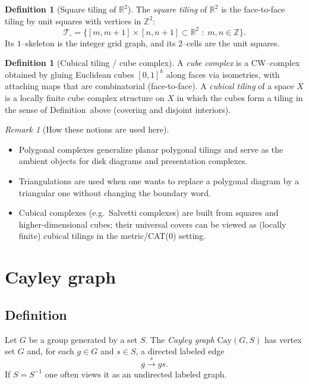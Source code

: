 \documentclass[11pt]{article}
\theoremstyle{definition}
\newtheorem{definition}[theorem]{Definition}
\theoremstyle{plain}
\theoremstyle{remark}
\newtheorem{remark}[theorem]{Remark}
\newcommand{\Cay}{\mathrm{Cay}}
\begin{document}
\begin{definition}[Square tiling of $\mathbb{R}^2$]
The \emph{square tiling} of $\mathbb{R}^2$ is the face-to-face tiling by unit squares with vertices in $\mathbb{Z}^2$:
\[
\mathcal{T}_{\square}=\bigl\{[m,m+1]\times[n,n+1]\subset\mathbb{R}^2 \;:\; m,n\in\mathbb{Z}\bigr\}.
\]
Its $1$--skeleton is the integer grid graph, and its $2$--cells are the unit squares.
\end{definition}

\begin{definition}[Cubical tiling / cube complex]
A \emph{cube complex} is a CW--complex obtained by gluing Euclidean cubes $[0,1]^k$ along faces via isometries,
with attaching maps that are combinatorial (face-to-face).
A \emph{cubical tiling} of a space $X$ is a locally finite cube complex structure on $X$ in which the cubes form a tiling
in the sense of Definition~above (covering and disjoint interiors).
\end{definition}

\begin{remark}[How these notions are used here]
\begin{itemize}
\item Polygonal complexes generalize planar polygonal tilings and serve as the ambient objects for disk diagrams
and presentation complexes.
\item Triangulations are used when one wants to replace a polygonal diagram by a triangular one without changing
the boundary word.
\item Cubical complexes (e.g.\ Salvetti complexes) are built from squares and higher-dimensional cubes; their universal covers
can be viewed as (locally finite) cubical tilings in the metric/CAT(0) setting.
\end{itemize}
\end{remark}


\clearpage
\section{Cayley graph}

\subsection*{Definition}
Let $G$ be a group generated by a set $S$.
The \emph{Cayley graph} $\Cay(G,S)$ has vertex set $G$ and, for each $g\in G$ and $s\in S$, a directed labeled edge
\[
g\xrightarrow{s}gs .
\]
If $S=S^{-1}$ one often views it as an undirected labeled graph.\cite{cayley1878}
\end{document}
